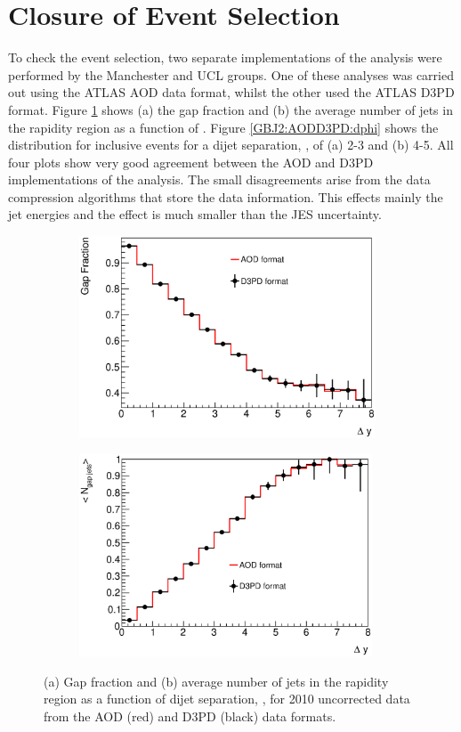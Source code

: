 \section{Closure of Event Selection}
\label{sec:GBJ2:AODD3PD}

To check the event selection, two separate implementations of the analysis were performed by the Manchester and UCL groups.
One of these analyses was carried out using the ATLAS AOD data format, whilst the other used the ATLAS D3PD format.
Figure \ref{GBJ2:AODD3PD:gap_njet} shows (a) the  gap fraction and (b) the  average number of jets in the rapidity region as a function of \dy{}.
Figure \ref{GBJ2:AODD3PD:dphi} shows the \dphi{} distribution for inclusive events for a dijet separation, \dy{}, of (a) 2-3 and (b) 4-5. 
All four plots show very good agreement between the AOD and D3PD implementations of the analysis.
The small disagreements arise from the data compression algorithms that store the data information.
This effects mainly the jet energies and the effect is much smaller than the JES uncertainty.


\begin{figure}
\centering
        \begin{subfigure}[b]{0.5\textwidth}
                \centering
                \includegraphics[height = 6cm,width=\textwidth]{figures/GBJ2/AODD3PD/Comp_GapFraction_deltaY.eps}
        \end{subfigure}%
        \begin{subfigure}[b]{0.5\textwidth}
                \centering
                \includegraphics[height = 6cm,width=\textwidth]{figures/GBJ2/AODD3PD/Comp_prof_deltaY_njets.eps}
        \end{subfigure}%
\caption[Comparison of gap fraction and mean number of jets between AOD data format and D3PD data format]{
(a) Gap fraction and (b) average number of jets in the rapidity region as a function of dijet separation, \dy{}, for 2010 uncorrected data from the AOD (red) and D3PD (black) data formats.
\label{GBJ2:AODD3PD:gap_njet}}
\end{figure}


